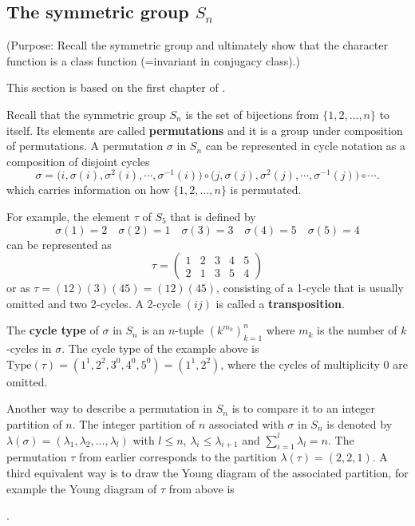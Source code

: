 \subsection{The symmetric group $S_n$}

(Purpose: Recall the symmetric group and ultimately show that the character function is a class function (=invariant in conjugacy class).)

This section is based on the first chapter of \cite{Sagan}.

Recall that the symmetric group $S_n$ is the set of bijections from $\{ 1, 2, \dots, n\}$ to itself. Its elements are called \textbf{permutations} and it is a group under composition of permutations. A permutation $\sigma$ in $S_n$ can be represented 
in cycle notation as a composition of disjoint cycles
\[
\sigma = \big( i, \sigma(i), \sigma^2(i), \cdots, \sigma^{-1}(i) \big) \circ \big( j, \sigma(j), \sigma^2(j), \cdots, \sigma^{-1}(j) \big) \circ \cdots.
\]
which carries information on how $\{1,2,\dots,n\}$ is permutated. \begin{example}
	For example, the element $\tau$ of $S_5$ that is defined by 
	\[
	\sigma(1) = 2 \quad \sigma(2) = 1 \quad \sigma(3) = 3 \quad \sigma(4) = 5 \quad \sigma(5) = 4
	\]
	can be represented as 
	\[ 
	\tau = 
	\begin{pmatrix}
		1 & 2 & 3 & 4 & 5 \\
		2 & 1 & 3 & 5 & 4
	\end{pmatrix}
	\]
	or as $\tau = (12)(3)(45) = (12)(45)$, consisting of a 1-cycle that is usually omitted and two 2-cycles. A 2-cycle $(ij)$ is called a \textbf{transposition}.
\end{example}

The \textbf{cycle type} of $\sigma$ in $S_n$ is an $n$-tuple $(k^{m_k})_{k=1}^n$ where $m_k$ is the number of $k$-cycles in $\sigma$. The cycle type of the example above is $\text{Type}(\tau) = (1^1,2^2,3^0,4^0,5^0) = (1^1,2^2)$, where the cycles of multiplicity 0 are omitted.

Another way to describe a permutation in $S_n$ is to compare it to an integer partition of $n$. The integer partition of $n$ associated with $\sigma$ in $S_n$ is denoted by $\lambda(\sigma) = ( \lambda_1, \lambda_2, \dots, \lambda_l)$ with $l \leq n$, $\lambda_i \leq \lambda_{i+1}$ and $\sum_{i=1}^l \lambda_l = n$. The permutation $\tau$ from earlier corresponds to the partition $\lambda(\tau) = (2, 2, 1)$. 
A third equivalent way is to draw the Young diagram of the associated partition, for example the Young diagram of $\tau$ from above is 
\begin{table}[hbt!]
	\centering
	.
\end{table}

